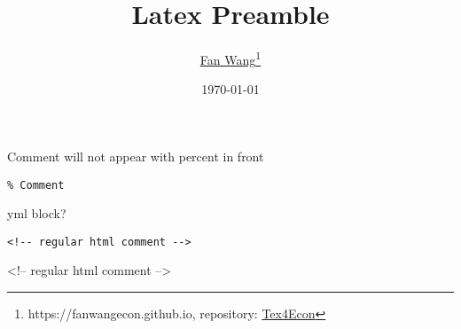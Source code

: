 \documentclass[12pt,english]{article}
\title{Latex Preamble}
\author{\href{https://fanwangecon.github.io/}{Fan Wang}\thanks{https://fanwangecon.github.io, repository: \href{https://fanwangecon.github.io/Tex4Econ/}{Tex4Econ}}}
\date{\today}
\begin{document}
Comment will not appear with percent in front

\begin{verbatim}
% Comment
\end{verbatim}

yml block?

\begin{verbatim}
<!-- regular html comment -->
\end{verbatim}

<!-- regular html comment -->
\end{document}
